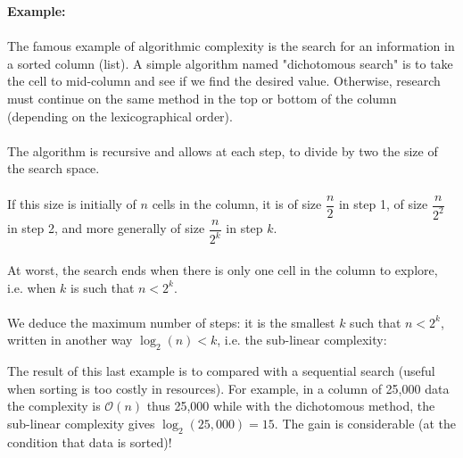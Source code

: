 	\begin{tcolorbox}[colframe=black,colback=white,sharp corners]
\textbf{{\Large {}}Example:}\\\\
The famous example of algorithmic complexity is the search for an  information in a sorted column (list). A simple algorithm named "dichotomous search" is to take the cell to mid-column and see if we find the desired value. Otherwise, research must continue on the same method in the top or bottom of the column (depending on the lexicographical order).\\\\
The algorithm is recursive and allows at each step, to divide by two the size of the search space.\\\\
If this size is initially of $n$ cells in the column, it is of size $\dfrac{n}{2}$ in step 1, of size $\dfrac{n}{2^2}$ in step 2, and more generally of size $\dfrac{n}{2^k}$ in step $k$.\\\\
At worst, the search ends when there is only one cell in the column to explore, i.e. when $k$ is such that $n<2^k$.\\\\
We deduce the maximum number of steps: it is the smallest $k$ such that $n<2^k$, written in another way $\log_2(n)<k$, i.e. the sub-linear complexity:
	
	\end{tcolorbox}
The result of this last example is to compared with a sequential search (useful when sorting is too costly in resources). For example, in a column of 25,000 data the complexity is $\mathcal{O}(n)$ thus 25,000 while with the dichotomous method, the sub-linear complexity gives $\log_2(25,000)=15$. The gain is considerable (at the condition that data is sorted)!

